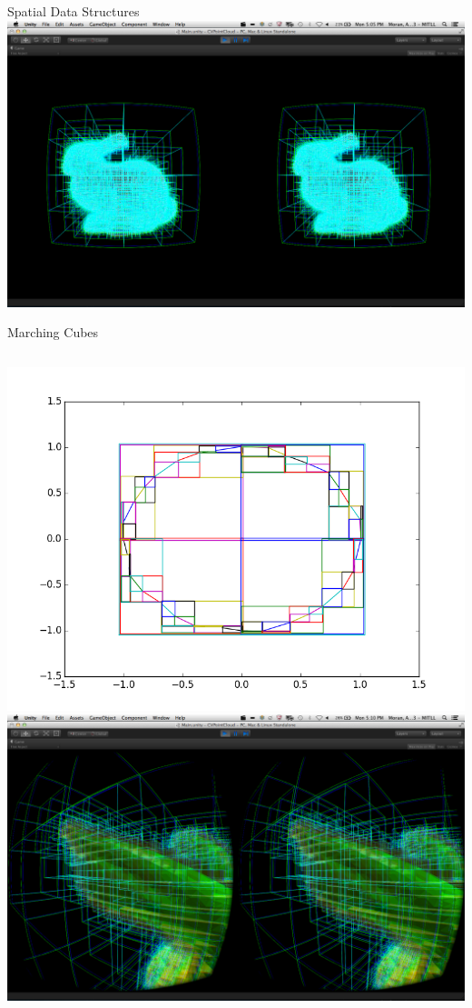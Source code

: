 \documentclass{beamer}
\begin{document}
\begin{frame}{Spatial Data Structures}
    \includegraphics[width=\textwidth]{Images/bunny_front_octree6.png}
\end{frame}


\begin{frame}{Marching Cubes}
  \begin{columns}
    \includegraphics[width=\textwidth]{Images/marching_squares.png}
    \includegraphics[width=\textwidth]{Images/bunny_ear_octreeCubesMesh.png}
  \end{columns}
\end{frame}
\end{document}
